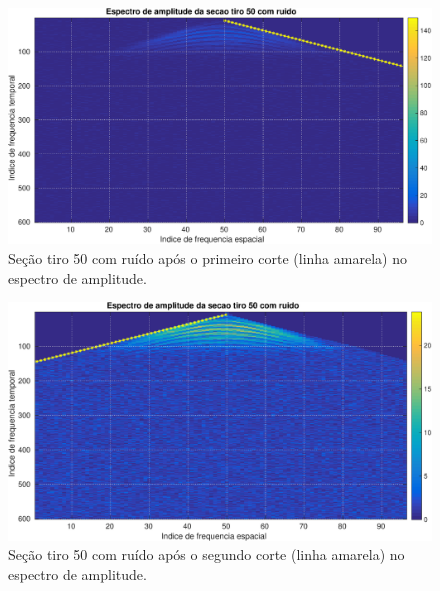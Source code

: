 \begin{landscape}
\begin{figure}[H]
\centering
\includegraphics[totalheight=14cm]{figuras/cap3/espc_tiro50_c1.eps}
\caption{Seção tiro 50 com ruído após o primeiro corte (linha amarela) no espectro de amplitude.}
\label{fig:espc_tiro50_c1}
\end{figure}
\end{landscape}

\begin{landscape}
\begin{figure}[H]
\centering
\includegraphics[totalheight=14cm]{figuras/cap3/espc_tiro50_c2.eps}
\caption{Seção tiro 50 com ruído após o segundo corte (linha amarela) no espectro de amplitude.}
\label{fig:espc_tiro50_c2}
\end{figure}
\end{landscape}

